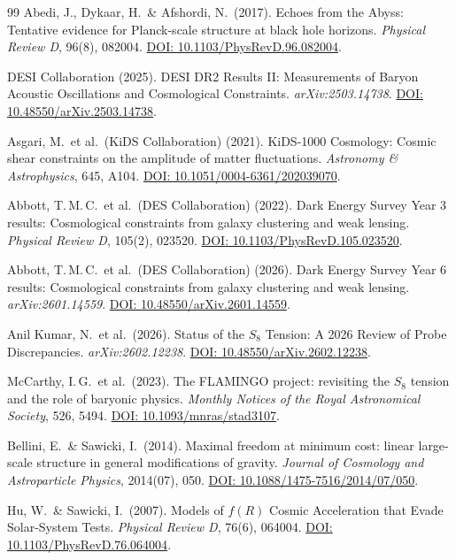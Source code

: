 \documentclass[aps,prd,twocolumn,superscriptaddress,nofootinbib]{revtex4-2}
\begin{document}
\begin{thebibliography}{99}
Abedi, J., Dykaar, H.\ \& Afshordi, N.\ (2017).
Echoes from the Abyss: Tentative evidence for Planck-scale structure at black hole horizons.
\textit{Physical Review D}, 96(8), 082004.
\href{https://doi.org/10.1103/PhysRevD.96.082004}{DOI: 10.1103/PhysRevD.96.082004}.

DESI Collaboration (2025).
DESI DR2 Results II: Measurements of Baryon Acoustic Oscillations and Cosmological Constraints.
\textit{arXiv:2503.14738}.
\href{https://doi.org/10.48550/arXiv.2503.14738}{DOI: 10.48550/arXiv.2503.14738}.

Asgari, M.\ et al.\ (KiDS Collaboration) (2021).
KiDS-1000 Cosmology: Cosmic shear constraints on the amplitude of matter fluctuations.
\textit{Astronomy \& Astrophysics}, 645, A104.
\href{https://doi.org/10.1051/0004-6361/202039070}{DOI: 10.1051/0004-6361/202039070}.

Abbott, T.\,M.\,C.\ et al.\ (DES Collaboration) (2022).
Dark Energy Survey Year 3 results: Cosmological constraints from galaxy clustering and weak lensing.
\textit{Physical Review D}, 105(2), 023520.
\href{https://doi.org/10.1103/PhysRevD.105.023520}{DOI: 10.1103/PhysRevD.105.023520}.

Abbott, T.\,M.\,C.\ et al.\ (DES Collaboration) (2026).
Dark Energy Survey Year 6 results: Cosmological constraints from galaxy clustering and weak lensing.
\textit{arXiv:2601.14559}.
\href{https://doi.org/10.48550/arXiv.2601.14559}{DOI: 10.48550/arXiv.2601.14559}.

Anil Kumar, N.\ et al.\ (2026).
Status of the $S_8$ Tension: A 2026 Review of Probe Discrepancies.
\textit{arXiv:2602.12238}.
\href{https://doi.org/10.48550/arXiv.2602.12238}{DOI: 10.48550/arXiv.2602.12238}.

McCarthy, I.\,G.\ et al.\ (2023).
The FLAMINGO project: revisiting the $S_8$ tension and the role of baryonic physics.
\textit{Monthly Notices of the Royal Astronomical Society}, 526, 5494.
\href{https://doi.org/10.1093/mnras/stad3107}{DOI: 10.1093/mnras/stad3107}.

Bellini, E.\ \& Sawicki, I.\ (2014).
Maximal freedom at minimum cost: linear large-scale structure in general modifications of gravity.
\textit{Journal of Cosmology and Astroparticle Physics}, 2014(07), 050.
\href{https://doi.org/10.1088/1475-7516/2014/07/050}{DOI: 10.1088/1475-7516/2014/07/050}.

Hu, W.\ \& Sawicki, I.\ (2007).
Models of $f(R)$ Cosmic Acceleration that Evade Solar-System Tests.
\textit{Physical Review D}, 76(6), 064004.
\href{https://doi.org/10.1103/PhysRevD.76.064004}{DOI: 10.1103/PhysRevD.76.064004}.


\end{thebibliography}
\end{document}

